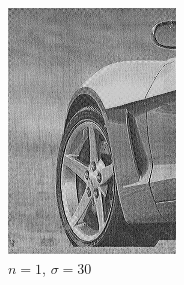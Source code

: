 \documentclass[
	12pt, %
]{style/fphw}
\begin{document}
\begin{figure}[H]
\begin{subfigure}[b]{.22\textwidth}
             \includegraphics[width=\textwidth]{Q5_3_1_30.png}
             \caption{$n=1$, $\sigma=30$}
             \label{Q5_3_1_30}
         \end{subfigure}
         \hfill
         \begin{subfigure}[b]{.22\textwidth}
             \centering

\end{subfigure}
\end{figure}
\end{document}
